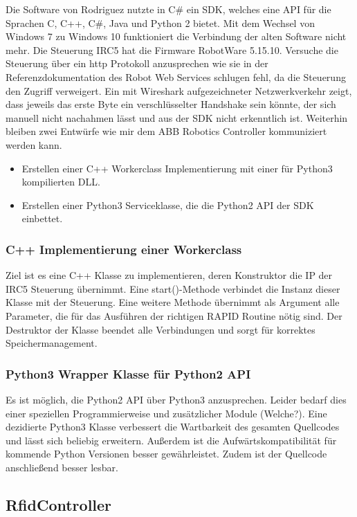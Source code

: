 Die Software von Rodriguez nutzte in C\# ein SDK, welches eine API für die Sprachen C, C++, C\#, Java und Python 2 bietet. 
Mit dem Wechsel von Windows 7 zu Windows 10 funktioniert die Verbindung der alten Software nicht mehr. Die Steuerung IRC5 hat die Firmware RobotWare 5.15.10. 
Versuche die Steuerung über ein http Protokoll anzusprechen wie sie in der Referenzdokumentation des Robot Web Services \cite{RWS} schlugen fehl, da die Steuerung den Zugriff verweigert. 
Ein mit Wireshark aufgezeichneter Netzwerkverkehr zeigt, dass jeweils das erste Byte ein verschlüsselter Handshake sein könnte, der sich manuell nicht nachahmen lässt und aus der SDK nicht erkenntlich ist. 
Weiterhin bleiben zwei Entwürfe wie mir dem ABB Robotics Controller kommuniziert werden kann. 
\begin{itemize}
    \item Erstellen einer C++ Workerclass Implementierung mit einer für Python3 kompilierten DLL. 
    \item Erstellen einer Python3 Serviceklasse, die die Python2 API der SDK einbettet.
\end{itemize}
\subsubsection*{C++ Implementierung einer Workerclass}
Ziel ist es eine C++ Klasse zu implementieren, deren Konstruktor die IP der IRC5 Steuerung übernimmt.
Eine start()-Methode verbindet die Instanz dieser Klasse mit der Steuerung. 
Eine weitere Methode übernimmt als Argument alle Parameter, die für das Ausführen der richtigen RAPID Routine nötig sind. 
Der Destruktor der Klasse beendet alle Verbindungen und sorgt für korrektes Speichermanagement. 

\subsubsection{Python3 Wrapper Klasse für Python2 API}

Es ist möglich, die Python2 API über Python3 anzusprechen. Leider bedarf dies einer speziellen Programmierweise und zusätzlicher Module (Welche?).
Eine dezidierte Python3 Klasse verbessert die Wartbarkeit des gesamten Quellcodes und lässt sich beliebig erweitern. 
Außerdem ist die Aufwärtskompatibilität für kommende Python Versionen besser gewährleistet. Zudem ist der Quellcode anschließend besser lesbar. 


\subsection{RfidController}

